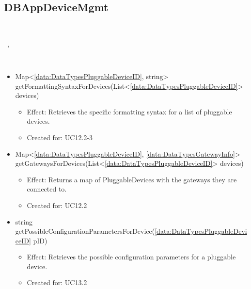   \subsection{DBAppDeviceMgmt}\label{int:DeviceDatabaseDeviceDBDBAppDeviceMgmt}
    \begin{description}
      \item[Provided by:] \iconcomponent{}~
      \item[Required by:] \iconcomponent{}~, \iconcomponent{}~
      \item[Operations:] ~
    \begin{itemize}[noitemsep,nolistsep,leftmargin=-.25cm]
      \item \textsf{Map\textless{}\ref{data:DataTypesPluggableDeviceID}, string\textgreater{} getFormattingSyntaxForDevices(List\textless{}\ref{data:DataTypesPluggableDeviceID}\textgreater{} devices)}
        \begin{itemize}[noitemsep,nolistsep]
           \item Effect: Retrieves the specific formatting syntax for a list of pluggable devices.
\item Created for: UC12.2-3
        \end{itemize}
      \item \textsf{Map\textless{}\ref{data:DataTypesPluggableDeviceID}, \ref{data:DataTypesGatewayInfo}\textgreater{} getGatewaysForDevices(List\textless{}\ref{data:DataTypesPluggableDeviceID}\textgreater{} devices)}
        \begin{itemize}[noitemsep,nolistsep]
           \item Effect: Returns a map of PluggableDevices with the gateways they are connected to.
\item Created for: UC12.2
        \end{itemize}
      \item \textsf{string getPossibleConfigurationParametersForDevice(\ref{data:DataTypesPluggableDeviceID} pID)}
        \begin{itemize}[noitemsep,nolistsep]
           \item Effect: Retrieves the possible configuration parameters for a pluggable device.
\item Created for: UC13.2
        \end{itemize}
    \end{itemize}
    \end{description}

